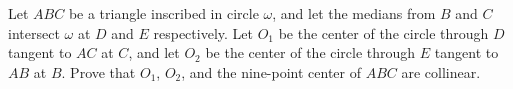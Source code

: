Let $ABC$ be a triangle inscribed in circle $\omega$, and let the medians from $B$ and $C$ intersect $\omega$ at $D$ and $E$ respectively. Let $O_1$ be the center of the circle through $D$ tangent to $AC$ at $C$, and let $O_2$ be the center of the circle through $E$ tangent to $AB$ at $B$. Prove that $O_1$, $O_2$, and the nine-point center of $ABC$ are collinear.